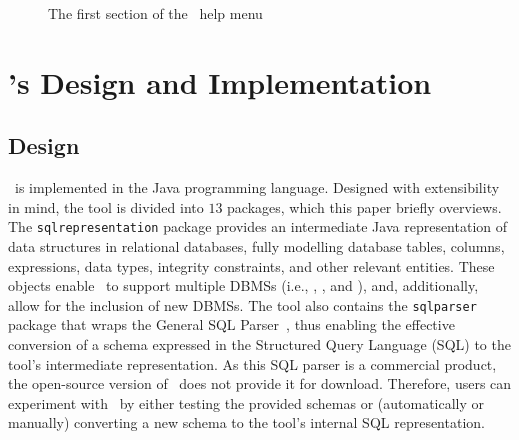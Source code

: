 
\begin{figure}



\vspace*{-.05in}

\caption{\label{fig:usage} The first section of the \sa~help menu}

\vspace*{-.15in}

\end{figure}

\vspace*{-0.05in}

\section{\sa's Design and Implementation}\label{sec:implementation}
\subsection{Design}


\sa~is implemented in the Java programming language.  Designed with extensibility in mind, the tool is divided into
$13$ packages, which this paper briefly overviews. The \texttt{sqlrepresentation} package provides an intermediate Java
representation of data structures in relational databases, fully modelling database tables, columns, expressions, data
types, integrity constraints, and other relevant entities. These objects enable \sa~to support multiple DBMSs (i.e.,
\sqlite, \postgres, and \hypersql), and, additionally, allow for the inclusion of new DBMSs. The tool also contains the
\texttt{sqlparser} package that wraps the General SQL Parser~\cite{generalsqlparser}, thus enabling the effective
conversion of a schema expressed in the Structured Query Language (SQL) to the tool's intermediate representation. As
this SQL parser is a commercial product, the open-source version of \mbox{\sa}~does not provide it for download.
Therefore, users can experiment with \sa~by either testing the provided schemas or (automatically or manually)
converting a new schema to the tool's internal SQL representation.

